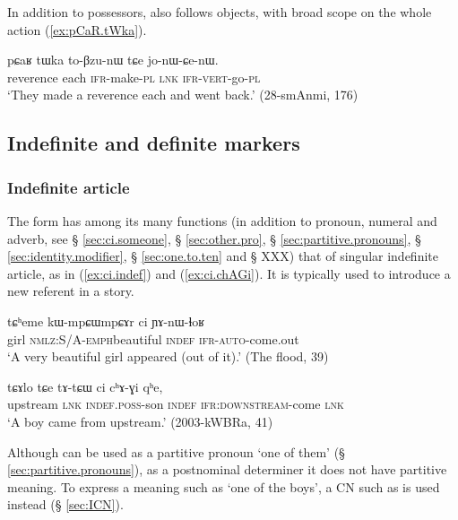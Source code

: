 In addition to possessors,  also follows objects, with broad scope on the whole action (\ref{ex:pCaR.tWka}).

    \begin{exe}
\ex \label{ex:pCaR.tWka}
\gll  pɕaʁ tɯka to-βzu-nɯ tɕe jo-nɯ-ɕe-nɯ.  \\
reverence each \textsc{ifr}-make-\textsc{pl} \textsc{lnk} \textsc{ifr}-\textsc{vert}-go-\textsc{pl} \\
\glt `They made a reverence each and went back.' (28-smAnmi, 176)
   \end{exe}
 
\subsection{Indefinite and definite markers} \label{sec:indefinite.markers}

\subsubsection{Indefinite article} \label{sec:indef.article}
The form  has among its many functions (in addition to pronoun, numeral and adverb, see § \ref{sec:ci.someone}, § \ref{sec:other.pro}, § \ref{sec:partitive.pronouns}, § \ref{sec:identity.modifier}, § \ref{sec:one.to.ten} and § XXX) that of singular indefinite article, as in (\ref{ex:ci.indef}) and (\ref{ex:ci.chAGi}). It is typically used to introduce a new referent in a story.

\begin{exe}
\ex \label{ex:ci.indef}
\gll tɕʰeme kɯ-mpɕɯ\redp{}mpɕɤr ci ɲɤ-nɯ-ɬoʁ \\
girl \textsc{nmlz}:S/A-\textsc{emph}\redp{}beautiful \textsc{indef} \textsc{ifr}-\textsc{auto}-come.out \\
\glt `A very beautiful girl appeared (out of it).' (The flood, 39)
\end{exe}

\begin{exe}
\ex \label{ex:ci.chAGi}
\gll tɕɤlo tɕe tɤ-tɕɯ ci cʰɤ-ɣi qʰe, \\
upstream \textsc{lnk} \textsc{indef}.\textsc{poss}-son \textsc{indef} \textsc{ifr}:\textsc{downstream}-come \textsc{lnk} \\
\glt `A boy came from upstream.' (2003-kWBRa, 41)
\end{exe}

Although  can be used as a partitive pronoun `one of them' (§ \ref{sec:partitive.pronouns}), as a postnominal determiner it does not have partitive meaning. To express a meaning such as `one of the boys', a CN such as  is used instead (§ \ref{sec:ICN}). 

